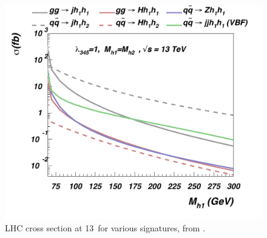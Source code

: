 \begin{figure}[htb]
	\includegraphics[width=\textwidth]{figures/EW/i2HDM/i2HDM_crossSections.pdf} 
	\caption{LHC cross section at 13~\tev for various signatures, from \cite{Belyaev:2015tap}.}
	\label{fig:IDM_xsecs}
\end{figure}
\clearpage

